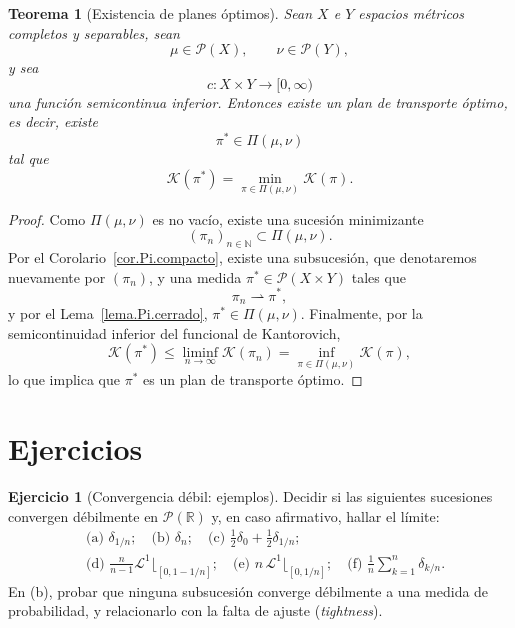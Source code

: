 \documentclass[12pt, a4paper]{amsbook}
\newcommand{\R}{{\mathbb R}}
\newcommand{\LL}{{\mathcal L}}
\newtheorem{teo}{Teorema}[section]
\theoremstyle{remark}
\theoremstyle{definition}
\newtheorem{ejercicio}{Ejercicio}[chapter]
\numberwithin{section}{chapter}
\numberwithin{subsection}{section}
\numberwithin{equation}{section}
\numberwithin{figure}{chapter}
\begin{document}
\begin{teo}[Existencia de planes óptimos]\label{teo.existencia.planes}
Sean \(X\) e \(Y\) espacios métricos completos y separables, sean
\[
\mu\in\mathcal P(X),
\qquad
\nu\in\mathcal P(Y),
\]
y sea
\[
c\colon X\times Y\to[0,\infty)
\]
una función semicontinua inferior. Entonces existe un plan de transporte óptimo, es decir, existe
\[
\pi^*\in\Pi(\mu,\nu)
\]
tal que
\[
\mathcal K(\pi^*)
=
\min_{\pi\in\Pi(\mu,\nu)}
\mathcal K(\pi).
\]
\end{teo}

\begin{proof}
Como \(\Pi(\mu,\nu)\) es no vacío, existe una sucesión minimizante
\[
(\pi_n)_{n\in\mathbb N}\subset\Pi(\mu,\nu).
\]
Por el Corolario~\ref{cor.Pi.compacto}, existe una subsucesión, que denotaremos
nuevamente por \((\pi_n)\), y una medida $\pi^*\in\mathcal P(X\times Y)$ tales que
\[
\pi_n\rightharpoonup\pi^*,
\]
y por el Lema~\ref{lema.Pi.cerrado}, $\pi^*\in\Pi(\mu,\nu)$.
Finalmente, por la semicontinuidad inferior del funcional de Kantorovich,
\[
\mathcal K(\pi^*)
\le
\liminf_{n\to\infty}\mathcal K(\pi_n)
=
\inf_{\pi\in\Pi(\mu,\nu)}\mathcal K(\pi),
\]
lo que implica que \(\pi^*\) es un plan de transporte óptimo.
\end{proof}


\section*{Ejercicios}

\begin{ejercicio}[Convergencia débil: ejemplos]\label{ejer.debil.ejemplos}
Decidir si las siguientes sucesiones convergen débilmente en $\mathcal P(\R)$
y, en caso afirmativo, hallar el límite:
\[
\begin{aligned}
&\text{(a) }\delta_{1/n};\quad
\text{(b) }\delta_n;\quad
\text{(c) }\tfrac12\delta_0+\tfrac12\delta_{1/n};\\[2pt]
&\text{(d) }\tfrac{n}{n-1}\LL^1\lfloor_{[0,1-1/n]};\quad
\text{(e) }n\,\LL^1\lfloor_{[0,1/n]};\quad
\text{(f) }\tfrac1n\sum_{k=1}^n\delta_{k/n}.
\end{aligned}
\]
En (b), probar que ninguna subsucesión converge débilmente a una medida de
probabilidad, y relacionarlo con la falta de ajuste (\emph{tightness}).
\end{ejercicio}
\end{document}
